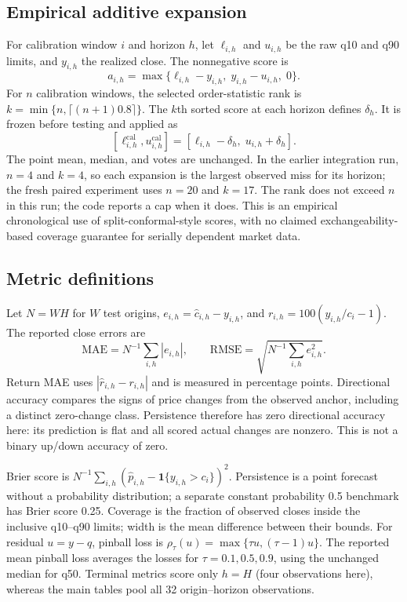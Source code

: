 \documentclass[11pt,a4paper]{article}
\begin{document}
\subsection{Empirical additive expansion}
For calibration window $i$ and horizon $h$, let $\ell_{i,h}$ and $u_{i,h}$ be
the raw q10 and q90 limits, and $y_{i,h}$ the realized close. The nonnegative
score is
\[
 a_{i,h}=\max\{\ell_{i,h}-y_{i,h},\;y_{i,h}-u_{i,h},\;0\}.
\]
For $n$ calibration windows, the selected order-statistic rank is
$k=\min\{n,\lceil(n+1)0.8\rceil\}$. The $k$th sorted score at each horizon
defines $\delta_h$. It is frozen before testing and applied as
\[
 [\ell^{\mathrm{cal}}_{i,h},u^{\mathrm{cal}}_{i,h}]
   =[\ell_{i,h}-\delta_h,\;u_{i,h}+\delta_h].
\]
The point mean, median, and votes are unchanged. In the earlier integration run,
$n=4$ and $k=4$, so each expansion is the largest observed miss for its horizon;
the fresh paired experiment uses $n=20$ and $k=17$. The rank
does not exceed $n$ in this run; the code reports a cap when it does. This is an
empirical chronological use of split-conformal-style scores, with no claimed
exchangeability-based coverage guarantee for serially dependent market data.

\begin{table}[htbp]
\centering\small

\caption{Frozen Kronos-base interval expansions, in USDT, fitted on the earlier
four calibration windows.}
\end{table}

\subsection{Metric definitions}
Let $N=WH$ for $W$ test origins, $e_{i,h}=\widehat c_{i,h}-y_{i,h}$, and
$r_{i,h}=100(y_{i,h}/c_i-1)$. The reported close errors are
\[
 \mathrm{MAE}=N^{-1}\sum_{i,h}|e_{i,h}|,\qquad
 \mathrm{RMSE}=\sqrt{N^{-1}\sum_{i,h}e_{i,h}^2}.
\]
Return MAE uses $|\widehat r_{i,h}-r_{i,h}|$ and is measured in percentage points.
Directional accuracy compares the signs of price changes from the observed
anchor, including a distinct zero-change class. Persistence therefore has zero
directional accuracy here: its prediction is flat and all scored actual changes
are nonzero. This is not a binary up/down accuracy of zero.

Brier score is $N^{-1}\sum_{i,h}(\widehat p_{i,h}-\mathbf1\{y_{i,h}>c_i\})^2$.
Persistence is a point forecast without a probability distribution; a separate
constant probability 0.5 benchmark has Brier score 0.25. Coverage is the fraction
of observed closes inside the inclusive q10--q90 limits; width is the mean
difference between their bounds. For residual $u=y-q$, pinball loss is
$\rho_\tau(u)=\max\{\tau u,(\tau-1)u\}$. The reported mean pinball loss
averages the losses for $\tau=0.1,0.5,0.9$, using the unchanged median for q50.
Terminal metrics score only $h=H$ (four observations here), whereas the main
tables pool all 32 origin--horizon observations.
\end{document}
